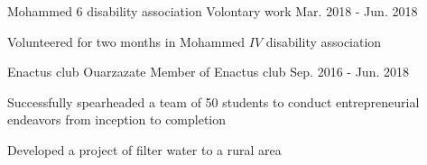 

\begin{cventries}
  \cventry
    {Mohammed 6 disability association} %
    {Volontary work} %
       {} %
    {Mar. 2018 - Jun. 2018} %
    {
      \begin{cvitems} %
        \item {Volunteered for two months in Mohammed $IV$ disability association}
      \end{cvitems}
    }
  \cventry
    {Enactus club Ouarzazate} %
  {Member of Enactus club} %
       {} %
    {Sep. 2016 - Jun. 2018} %
    {
      \begin{cvitems} %
        \item {Successfully spearheaded a team of 50 students to conduct entrepreneurial endeavors from inception to completion}
        \item {Developed a project of filter water to a rural area}
      \end{cvitems}
    }

\end{cventries}
